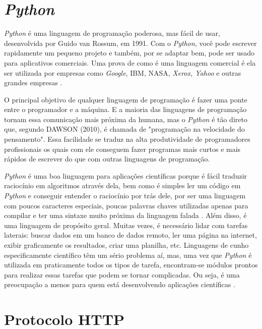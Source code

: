 \section{\textit{Python}}

\textit{Python} é uma linguagem de programação poderosa, mas fácil de usar, desenvolvida por Guido van Rossum, em 1991. Com o \textit{Python}, você pode escrever rapidamente um pequeno projeto e também, por se adaptar bem, pode ser usado para aplicativos comerciais. Uma prova de como é uma linguagem comercial é ela ser utilizada por empresas como \textit{Google}, IBM, NASA, \textit{Xerox, Yahoo} e outras grandes empresas \cite{dawson2010}.

O principal objetivo de qualquer linguagem de programação é fazer uma ponte entre o programador e a máquina. E a maioria das linguagens de programação tornam essa comunicação mais próxima da humana, mas o \textit{Python} é tão direto que, segundo DAWSON (2010), é chamada de "programação na velocidade do pensamento". Essa facilidade se traduz na alta produtividade de programadores profissionais os quais com ele conseguem fazer programas mais curtos e mais rápidos de escrever do que com outras linguagens de programação. 

\textit{Python} é uma boa linguagem para aplicações científicas porque é fácil traduzir raciocínio em algoritmos através dela, bem como é simples ler um código em \textit{Python} e conseguir entender o raciocínio por trás dele, por ser uma linguagem com poucos caracteres especiais, poucas palavras chaves utilizadas apenas para compilar e ter uma sintaxe muito próxima da linguagem falada \cite{reitz2018}. Além disso, é uma linguagem de propósito geral. Muitas vezes, é necessário lidar com tarefas laterais: buscar dados em um banco de dados remoto, ler uma página na internet, exibir graficamente os resultados, criar uma planilha, etc. Linguagens de cunho especificamente científico têm um sério problema aí, mas, uma vez que \textit{Python} é utilizada em praticamente todos os tipos de tarefa, encontram-se módulos prontos para realizar essas tarefas que podem se tornar complicadas. Ou seja, é uma preocupação a menos para quem está desenvolvendo aplicações científicas \cite{downey2012}.
  

\section{Protocolo HTTP}

